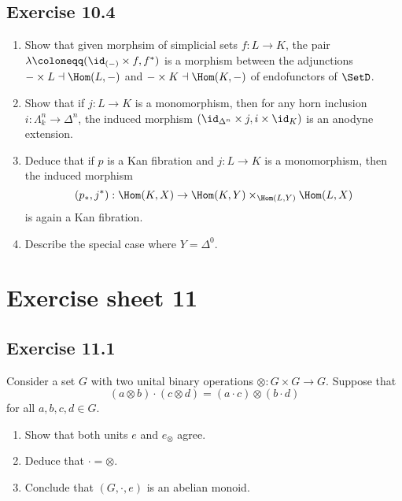 \subsection{ Exercise 10.4 }

\begin{enumerate}[label=(\alph*)]
    \item 
    Show that given morphsim of simplicial sets $ f : L \to K $, the pair $ \lambda \coloneqq ( \id_{(-)} \times f , f^* ) $ is a morphism between the adjunctions $ - \times L \dashv \Hom ( L , - ) $ and $ - \times K \dashv \Hom ( K , - ) $ of endofunctors of $ \SetD $.

    \item 
    Show that if $ j : L \to K $ is a monomorphism, then for any horn inclusion $ i : \Lambda_k^n \to \Delta^n $, the induced morphism $ ( \id_{ \Delta^n } \times j , i \times \id_K ) $ is an anodyne extension.

    \item 
    Deduce that if $ p $ is a Kan fibration and $ j : L \to K $ is a monomorphism, then the induced morphism
    \[
        ( p_* , j^* ): \Hom( K , X ) \to \Hom ( K , Y ) \times_{ \Hom ( L , Y ) } \Hom ( L , X )
    \]
    is again a Kan fibration.

    \item  
    Describe the special case where $ Y = \Delta^0 $.
    
\end{enumerate}

\section{Exercise sheet 11}

\subsection{ Exercise 11.1 }

Consider a set $ G $ with two unital binary operations $ \otimes : G \times G \to G $.
Suppose that 
\[
    ( a \otimes b ) \cdot ( c \otimes d ) = ( a \cdot c ) \otimes ( b \cdot d )
\]
for all $ a , b, c , d \in G $.
\begin{enumerate}
    \item 
    Show that both units $e$ and $e_{\otimes}$ agree.

    \item 
    Deduce that $ \cdot = \otimes $.

    \item 
    Conclude that $ ( G , \cdot , e ) $ is an abelian monoid.
\end{enumerate}

